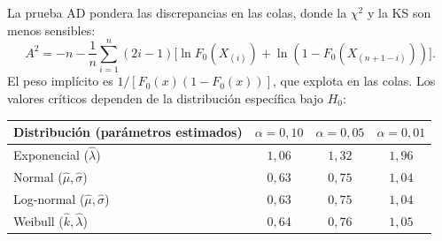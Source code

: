 \documentclass[11pt, letterpaper]{article}
\begin{document}
La prueba AD pondera las discrepancias en las colas, donde la $\chi^2$ y la KS son menos sensibles:
\[
A^2 = -n - \frac{1}{n}\sum_{i=1}^{n}(2i-1)\bigl[\ln F_0(X_{(i)}) + \ln(1-F_0(X_{(n+1-i)}))\bigr].
\]
El peso implícito es $1/[F_0(x)(1-F_0(x))]$, que explota en las colas. Los valores críticos dependen de la distribución específica bajo $H_0$:

\begin{center}\small
\renewcommand{\arraystretch}{1.2}
\begin{tabular}{lccc}
\toprule
\textbf{Distribución (parámetros estimados)} & $\alpha=0{,}10$ & $\alpha=0{,}05$ & $\alpha=0{,}01$ \\
\midrule
Exponencial ($\hat\lambda$)         & $1{,}06$ & $1{,}32$ & $1{,}96$ \\
Normal ($\hat\mu,\hat\sigma$)       & $0{,}63$ & $0{,}75$ & $1{,}04$ \\
Log-normal ($\hat\mu,\hat\sigma$)   & $0{,}63$ & $0{,}75$ & $1{,}04$ \\
Weibull ($\hat k,\hat\lambda$)      & $0{,}64$ & $0{,}76$ & $1{,}05$ \\
\bottomrule
\end{tabular}
\end{center}
\end{document}
